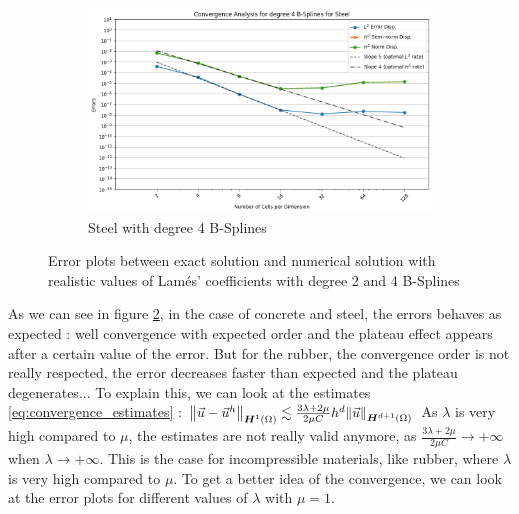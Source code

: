 \documentclass[a4paper,12pt,twoside]{report}
\begin{document}
\begin{figure}[!h]
\begin{subfigure}[b]{0.49\textwidth}
		\includegraphics[width=\textwidth]{figures/figures_non_mixed_realistic/convergence_plot_degree_4_lambda=120000000000.0.png}
		\caption{Steel with degree 4 B-Splines}
		\label{fig:steel_degree_4}
	\end{subfigure}
	\caption{Error plots between exact solution and numerical solution with realistic values of Lamés' coefficients with degree 2 and 4 B-Splines}
	\label{fig:error_realistic_lame}
\end{figure}

As we can see in figure \ref{fig:error_realistic_lame}, in the case of concrete and steel, the errors behaves as expected : well convergence with expected order and the plateau effect appears after a certain value of the error. 
But for the rubber, the convergence order is not really respected, the error decreases faster than expected and the plateau degenerates... 
To explain this, we can look at the estimates \eqref{eq:convergence_estimates} :
$\norm{\vec u - \vec u^h}_{\boldsymbol H^1(\Omega)} \lesssim \frac{3\lambda + 2\mu}{2\mu C} h^d \norm{\vec u}_{\boldsymbol H^{d+1}(\Omega)}$
As $\lambda$ is very high compared to $\mu$, the estimates are not really valid anymore, as $\frac{3\lambda + 2\mu}{2\mu C} \rightarrow + \infty$ when $\lambda \rightarrow + \infty$. 
This is the case for incompressible materials, like rubber, where $\lambda$ is very high compared to $\mu$. To get a better idea of the convergence, we can look at the error plots for different values of $\lambda$ with $\mu = 1$.
\end{document}
